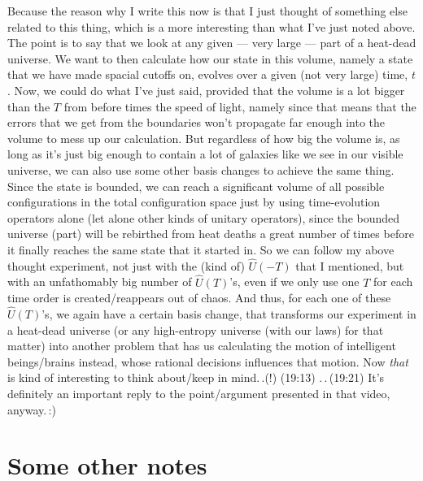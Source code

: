 \documentclass{report}
\begin{document}
Because the reason why I write this now is that I just thought of something else related to this thing, which is a more interesting than what I've just noted above. The point is to say that we look at any given --- very large --- part of a heat-dead universe. We want to then calculate how our state in this volume, namely a state that we have made spacial cutoffs on, evolves over a given (not very large) time, $t$. Now, we could do what I've just said, provided that the volume is a lot bigger than the $T$ from before times the speed of light, namely since that means that the errors that we get from the boundaries won't propagate far enough into the volume to mess up our calculation. But regardless of how big the volume is, as long as it's just big enough to contain a lot of galaxies like we see in our visible universe, we can also use some other basis changes to achieve the same thing. Since the state is bounded, we can reach a significant volume of all possible configurations in the total configuration space just by using time-evolution operators alone (let alone other kinds of unitary operators), since the bounded universe (part) will be rebirthed from heat deaths a great number of times before it finally reaches the same state that it started in. So we can follow my above thought experiment, not just with the (kind of) $\hat U (-T)$ that I mentioned, but with an unfathomably big number of $\hat U (T)$'s, even if we only use one $T$ for each time order is created/reappears out of chaos. And thus, for each one of these $\hat U (T)$'s, we again have a certain basis change, that transforms our experiment in a heat-dead universe (or any high-entropy universe (with our laws) for that matter) into another problem that has us calculating the motion of intelligent beings/brains instead, whose rational decisions influences that motion. Now \emph{that} is kind of interesting to think about/keep in mind.\,.(!) (19:13) .\,.\,(19:21) It's definitely an important reply to the point/argument presented in that video, anyway.\,:)




\section{Some other notes}
\end{document}
